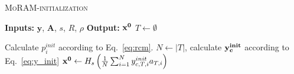 \begin{algorithm}[t]
	\caption{\textsc{MoRAM-initialization}}
	\label{alg:RCM}
	\begin{algorithmic}
		\State\textbf{Inputs:} $\mathbf{y}$, $\mathbf{A}$, $s$, $R$, $\rho$
		\State\textbf{Output:}  $\mathbf{x^0}$
		\State $T \leftarrow \emptyset$%
%		
		
		\EndIf
		\State Calculate $p^{init}_i$ according to Eq.~\ref{eq:rcm}.
		\EndFor
		\State $N \leftarrow |T|$, calculate $\mathbf{y^{init}_c}$ according to Eq.~\ref{eq:y_init}
		\State $\mathbf{x^0} \leftarrow H_s\left( \frac{1}{N}\sum_{i=1}^{N}y^{init}_{c,T,i}a_{T,i}\right)$
	\end{algorithmic}
\end{algorithm}
